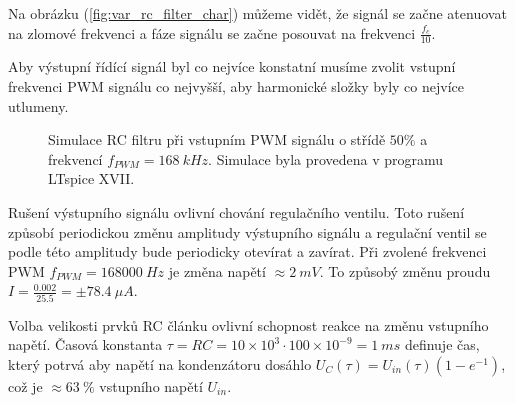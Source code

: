 Na obrázku (\ref{fig:var_rc_filter_char}) můžeme vidět, že signál se začne atenuovat na zlomové frekvenci a fáze signálu se začne posouvat na frekvenci $\frac{f_c}{10}$.  \par

Aby výstupní řídící signál byl co nejvíce konstatní musíme zvolit vstupní frekvenci PWM signálu co nejvyšší, aby harmonické složky byly co nejvíce utlumeny.

\begin{figure}[H]
    \caption{Simulace RC filtru při vstupním PWM signálu o střídě $50\%$ a frekvencí $f_{PWM} = 168 \ kHz $. Simulace byla provedena v programu LTspice XVII.}
    \label{fig:filtered_pwm}
\end{figure}


Rušení výstupního signálu ovlivní chování regulačního ventilu. Toto rušení způsobí periodickou změnu amplitudy výstupního signálu a regulační ventil se podle této amplitudy bude periodicky otevírat a zavírat. Při zvolené frekvenci PWM $f_{PWM} = 168000 \ Hz $ je změna napětí $\approx 2 \ mV$. To způsobý změnu proudu $I = \frac{0.002}{25.5} = \pm 78.4 \ \mu A $. \par
Volba velikosti prvků RC článku ovlivní schopnost reakce na změnu vstupního napětí.
Časová konstanta $\tau = RC = 10 \times 10^{3} \cdot 100 \times 10^{-9}= 1\ ms$ definuje čas, který potrvá aby napětí na kondenzátoru dosáhlo $U_{C}(\tau) = U_{in}(\tau)(1 - e^{-1})$, což je $\approx 63 \ \% $ vstupního napětí $U_{in}$.

